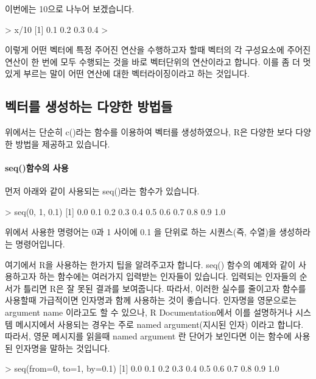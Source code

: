 \documentclass{book}
\begin{document}
이번에는 10으로 나누어 보겠습니다.

\begin{Schunk}
\begin{Soutput}
> x/10
[1] 0.1 0.2 0.3 0.4
> 
\end{Soutput}
\end{Schunk}

이렇게 어떤 벡터에 특정 주어진 연산을 수행하고자 할때 벡터의 각 구성요소에 주어진 연산이 한 번에 모두 수행되는 것을 바로 벡터단위의 연산이라고 합니다. 
이를 좀 더 멋있게 부르는 말이 어떤 연산에 대한 벡터라이징이라고 하는 것입니다. 


\subsection{벡터를 생성하는 다양한 방법들}

위에서는 단순히 c()라는 함수를 이용하여 벡터를 생성하였으나, R은 다양한 보다 다양한 방법을 제공하고 있습니다. 

\paragraph{seq()함수의 사용} 먼저 아래와 같이 사용되는 seq()라는 함수가 있습니다. 

\begin{Schunk}
\begin{Soutput}
> seq(0, 1, 0.1)
 [1] 0.0 0.1 0.2 0.3 0.4 0.5 0.6 0.7 0.8 0.9 1.0
\end{Soutput}
\end{Schunk}

위에서 사용한 명령어는 0과 1 사이에 0.1 을 단위로 하는 시퀀스(즉, 수열)을 생성하라는 명령어입니다. 

여기에서 R을 사용하는 한가지 팁을 알려주고자 합니다.
seq() 함수의 예제와 같이 사용하고자 하는 함수에는 여러가지 입력받는 인자들이 있습니다. 
입력되는 인자들의 순서가 틀리면 R은 잘 못된 결과를 보여줍니다. 
따라서, 이러한 실수를 줄이고자 함수를 사용할때 가급적이면 인자명과 함께 사용하는 것이 좋습니다.  
인자명을 영문으로는 argument name 이라고도 할 수 있으나, R Documentation에서 이를 설명하거나 시스템 메시지에서 사용되는 경우는 주로 named argument(지시된 인자) 이라고 합니다. 
따라서, 영문 메시지를 읽을때 named argument 란 단어가 보인다면 이는 함수에 사용된 인자명을 말하는 것입니다. 

\begin{Schunk}
\begin{Soutput}
> seq(from=0, to=1, by=0.1)
 [1] 0.0 0.1 0.2 0.3 0.4 0.5 0.6 0.7 0.8 0.9 1.0
\end{Soutput}
\end{Schunk}
\end{document}
